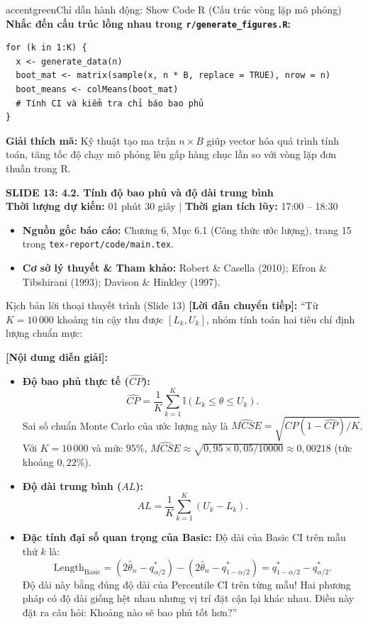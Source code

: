 \documentclass[10pt,a4paper]{article}
\newcommand{\slideheader}[4]{
    \vspace{0.4cm}
    \begin{tcolorbox}[colback=primary!7!white, colframe=primary, arc=2mm, boxrule=1pt, left=4mm, right=4mm, top=2.5mm, bottom=2.5mm]
        {\Large\bfseries\color{primary} SLIDE #1: #2}\\[0.1cm]
        {\small\textbf{Thời lượng dự kiến:} #3 \quad | \quad \textbf{Thời gian tích lũy:} #4}
    \end{tcolorbox}
    \vspace{0.15cm}
}
\begin{document}
\begin{actionbox}{accentgreen}{Chỉ dẫn hành động: Show Code R (Cấu trúc vòng lặp mô phỏng)}
    \textbf{Nhắc đến cấu trúc lồng nhau trong \texttt{r/generate\_figures.R}:}
\begin{verbatim}
for (k in 1:K) {
  x <- generate_data(n)
  boot_mat <- matrix(sample(x, n * B, replace = TRUE), nrow = n)
  boot_means <- colMeans(boot_mat)
  # Tính CI và kiểm tra chỉ báo bao phủ
}
\end{verbatim}
    \textbf{Giải thích mã:} Kỹ thuật tạo ma trận $n \times B$ giúp vector hóa quá trình tính toán, tăng tốc độ chạy mô phỏng lên gấp hàng chục lần so với vòng lặp đơn thuần trong R.
\end{actionbox}

\slideheader{13}{4.2. Tính độ bao phủ và độ dài trung bình}{01 phút 30 giây}{17:00 -- 18:30}

\begin{itemize}
    \item \textbf{Nguồn gốc báo cáo:} Chương 6, Mục 6.1 (Công thức ước lượng), trang 15 trong \texttt{tex-report/code/main.tex}.
    \item \textbf{Cơ sở lý thuyết \& Tham khảo:} Robert \& Casella (2010); Efron \& Tibshirani (1993); Davison \& Hinkley (1997).
\end{itemize}

\begin{scriptbox}{Kịch bản lời thoại thuyết trình (Slide 13)}
    \textbf{[Lời dẫn chuyển tiếp]:} ``Từ $K=10\,000$ khoảng tin cậy thu được $[L_k, U_k]$, nhóm tính toán hai tiêu chí định lượng chuẩn mực:
    
    \textbf{[Nội dung diễn giải]:} 
    \begin{itemize}
        \item \textbf{Độ bao phủ thực tế ($\widehat{CP}$):}
        \[
        \widehat{CP} = \frac{1}{K}\sum_{k=1}^K \mathbb{I}(L_k \le \theta \le U_k).
        \]
        Sai số chuẩn Monte Carlo của ước lượng này là $\widehat{MCSE} = \sqrt{\widehat{CP}(1-\widehat{CP})/K}$. Với $K=10\,000$ và mức $95\%$, $\widehat{MCSE} \approx \sqrt{0{,}95 \times 0{,}05 / 10000} \approx 0{,}00218$ (tức khoảng $0{,}22\%$).
        \item \textbf{Độ dài trung bình ($AL$):}
        \[
        AL = \frac{1}{K}\sum_{k=1}^K (U_k - L_k).
        \]
        \item \textbf{Đặc tính đại số quan trọng của Basic:} Độ dài của Basic CI trên mẫu thứ $k$ là:
        \[
        \text{Length}_{\text{Basic}} = (2\hat\theta_n - q_{\alpha/2}^*) - (2\hat\theta_n - q_{1-\alpha/2}^*) = q_{1-\alpha/2}^* - q_{\alpha/2}^*.
        \]
        Độ dài này bằng đúng độ dài của Percentile CI trên từng mẫu! Hai phương pháp có độ dài giống hệt nhau nhưng vị trí đặt cận lại khác nhau. Điều này đặt ra câu hỏi: Khoảng nào sẽ bao phủ tốt hơn?''
    \end{itemize}
\end{scriptbox}
\end{document}
